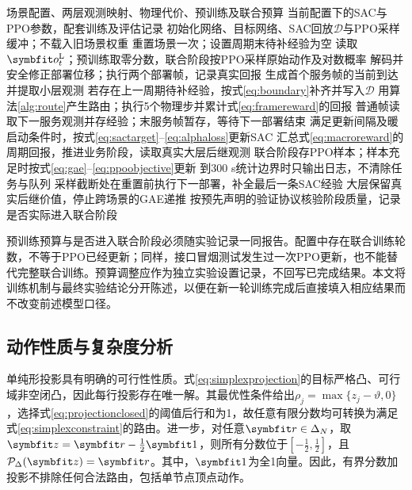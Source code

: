 \begin{algorithm*}[t]
\caption{具有真实部署边界的双时间尺度训练}
\label{alg:joint}
\small
\begin{algorithmic}[1]
\Require 场景配置、两层观测映射、物理代价、预训练及联合预算
\Ensure 当前配置下的SAC与PPO参数，配套训练及评估记录
\State 初始化网络、目标网络、SAC回放$\mathcal D$与PPO采样缓冲；不载入旧场景权重
  \State 重置场景一次；设置周期末待补经验为空
   \State 读取$\vct o_t^{\mathrm L}$；预训练取零分数，联合阶段按PPO采样原始动作及对数概率
   \State 解码并安全修正部署位移；执行两个部署帧，记录真实回报
   \State 生成首个服务帧的当前到达并提取小层观测
   \State 若存在上一周期待补经验，按式\eqref{eq:boundary}补齐并写入$\mathcal D$
    \State 用算法\ref{alg:route}产生路由；执行5个物理步并累计式\eqref{eq:framereward}的回报
    \State 普通帧读取下一服务观测并存经验；末服务帧暂存，等待下一部署结束
    \State 满足更新间隔及暖启动条件时，按式\eqref{eq:sactarget}--\eqref{eq:alphaloss}更新SAC
   \EndFor
   \State 汇总式\eqref{eq:macroreward}的周期回报，推进业务阶段，读取真实大层后继观测
   \State 联合阶段存PPO样本；样本充足时按式\eqref{eq:gae}--\eqref{eq:ppoobjective}更新
   \State 到300 s统计边界时只输出日志，不清除任务与队列
  \EndFor
  \State 采样截断处在重置前执行下一部署，补全最后一条SAC经验
  \State 大层保留真实后继价值，停止跨场景的GAE递推
 \EndFor
 \State 按预先声明的验证协议核验阶段质量，记录是否实际进入联合阶段
\EndFor
\end{algorithmic}
\end{algorithm*}

预训练预算与是否进入联合阶段必须随实验记录一同报告。配置中存在联合训练轮数，不等于PPO已经更新；同样，接口冒烟测试发生过一次PPO更新，也不能替代完整联合训练。预算调整应作为独立实验设置记录，不回写已完成结果。本文将训练机制与最终实验结论分开陈述，以便在新一轮训练完成后直接填入相应结果而不改变前述模型口径。

\subsection{动作性质与复杂度分析}
单纯形投影具有明确的可行性性质。式\eqref{eq:simplexprojection}的目标严格凸、可行域非空闭凸，因此每行投影存在唯一解。其最优性条件给出$\rho_j=\max\{z_j-\vartheta,0\}$，选择式\eqref{eq:projectionclosed}的阈值后行和为1，故任意有限分数均可转换为满足式\eqref{eq:simplexconstraint}的路由。进一步，对任意$\vct r\in\Delta_N$，取$\vct z=\vct r-\frac12\vct1$，则所有分数位于$[-\frac12,\frac12]$，且$\mathcal P_\Delta(\vct z)=\vct r$。其中，$\vct1$为全1向量。因此，有界分数加投影不排除任何合法路由，包括单节点顶点动作。


